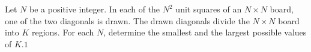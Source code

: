 Let $N$ be a positive integer. In each of the $N^2$ unit squares of an $N\times N$ board, one of the two diagonals is drawn. The drawn diagonals divide the $N\times N$ board into $K$ regions. For each $N$,  determine the smallest and the largest possible values of $K$.$1$